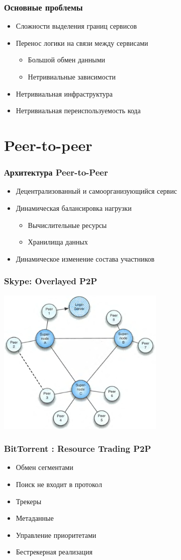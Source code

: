 \documentclass[xetex,mathserif,serif]{beamer}
\begin{document}
	\begin{frame}
		\frametitle{Основные проблемы}
		\begin{itemize}
			\item Сложности выделения границ сервисов
			\item Перенос логики на связи между сервисами
			\begin{itemize}
				\item Большой обмен данными
				\item Нетривиальные зависимости
			\end{itemize}
			\item Нетривиальная инфраструктура
			\item Нетривиальная переиспользуемость кода
		\end{itemize}
	\end{frame}

	\section{Peer-to-peer}

	\begin{frame}
		\frametitle{Архитектура Peer-to-Peer}
		\begin{itemize}
			\item Децентрализованный и самоорганизующийся сервис
			\item Динамическая балансировка нагрузки
			\begin{itemize}
				\item Вычислительные ресурсы
				\item Хранилища данных
			\end{itemize}
			\item Динамическое изменение состава участников
		\end{itemize}
	\end{frame}

	\begin{frame}
		\frametitle{Skype: Overlayed P2P}
		\begin{center}
			\includegraphics[width=0.6\textwidth]{skype.png}
		\end{center}
	\end{frame}

	\begin{frame}
		\frametitle{BitTorrent : Resource Trading P2P}
		\begin{itemize}
			\item Обмен сегментами
			\item Поиск не входит в протокол
			\item Трекеры
			\item Метаданные
			\item Управление приоритетами
			\item Бестрекерная реализация
		\end{itemize}
	\end{frame}
\end{document}
